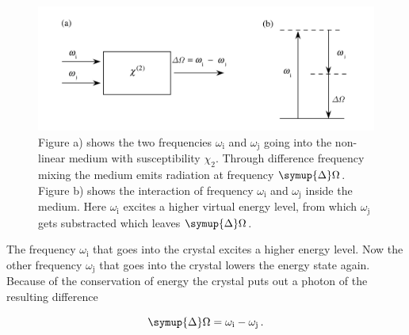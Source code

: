 \begin{figure}
    \centering
    \includegraphics[width=\textwidth]{refferenced_pic/diffrence_frequency_mixing.PNG}
    \caption{Figure a) shows the two frequencies $\omega_\text{i} $ and $\omega_\text{j}$ going into the non-linear medium with susceptibility $\chi_2$.
    Through difference frequency mixing the medium emits radiation at frequency $\symup{\Delta}\Omega$.
    Figure b) shows the interaction of frequency $\omega_\text{i} $ and $\omega_\text{j}$ inside the medium.
    Here $\omega_\text{i}$ excites a higher virtual energy level, from which $\omega_\text{j}$ gets substracted which leaves $\symup{\Delta}\Omega$.}
    \label{fig:freq_mix}
\end{figure}
The frequency $\omega_\text{i}$ that goes into the crystal excites a higher energy level.
Now the other frequency $\omega_\text{j}$ that goes into the crystal lowers the energy state again.
Because of the conservation of energy the crystal puts out a photon of the resulting difference

\begin{equation}
    \symup{\Delta}\Omega = \omega_\text{i} - \omega_\text{j} \, .
\end{equation}





